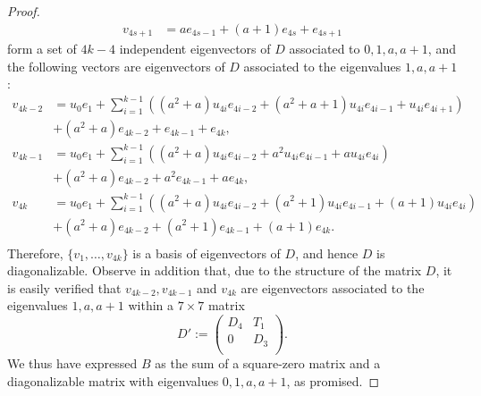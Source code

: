 \documentclass[10pt,a4paper]{amsart}
\begin{document}
\begin{proof}
\begin{align*}
 v_{4s+1}&=a e_{4s-1}+(a+1) e_{4s}+e_{4s+1}
\end{align*}
form a set of $4k-4$ independent eigenvectors of $D$ associated to $0,1,a,a+1$, and  the following vectors are eigenvectors of $D$ associated to the eigenvalues $1,a,a+1$:
\begin{align*}
  v_{4k-2}&=u_0 e_1+\sum_{i=1}^{k-1}  ( (a^2+a) u_{4i} e_{4i-2}+ (a^2+a+1) u_{4i} e_{4i-1}+ u_{4i} e_{4i+1})\\&+ (a^2+a) e_{4k-2}+  e_{4k-1}+ e_{4k},\\
  v_{4k-1}&=u_0 e_1+\sum_{i=1}^{k-1}  ( (a^2+a) u_{4i} e_{4i-2}+ a^2 u_{4i} e_{4i-1}+a u_{4i} e_{4i})\\&+ (a^2+a) e_{4k-2}+a^2  e_{4k-1}+ a e_{4k},\\
  v_{4k}&=u_0 e_1+\sum_{i=1}^{k-1}  ( (a^2+a) u_{4i} e_{4i-2}+ (a^2+1) u_{4i} e_{4i-1}+(a+1) u_{4i} e_{4i})\\&+ (a^2+a) e_{4k-2}+(a^2+1)  e_{4k-1}+ (a+1) e_{4k}.\\
\end{align*}
Therefore, $\{v_1,\dots, v_{4k}\}$ is a basis of eigenvectors of $D$, and hence $D$ is diagonalizable. Observe in addition that, due to the structure of the matrix
$D$, it is easily verified that $v_{4k-2}, v_{4k-1}$ and $v_{4k}$ are eigenvectors associated to the eigenvalues $1,a,a+1$ within a $7\times 7$ matrix
$$D':=\left(
  \begin{array}{cc}
    D_4 & T_1 \\
    0 & D_3\\
  \end{array}
\right).
$$
We thus have expressed $B$ as the sum of a square-zero matrix and a diagonalizable matrix with eigenvalues $0,1,a,a+1$, as promised.
\end{proof}
\end{document}
